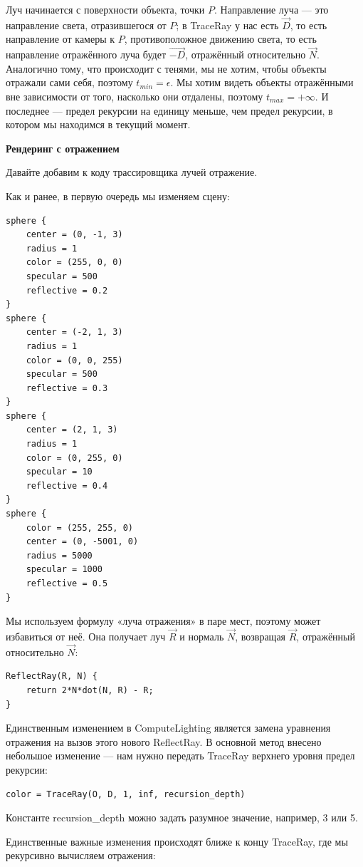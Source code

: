 Луч начинается с поверхности объекта, точки $P$. Направление луча — это направление света, отразившегося от $P$; в TraceRay у нас есть $\vec{D}$, то есть направление от камеры к $P$, противоположное движению света, то есть направление отражённого луча будет $\vec{-D}$, отражённый относительно $\vec{N}$. Аналогично тому, что происходит с тенями, мы не хотим, чтобы объекты отражали сами себя, поэтому $t_{min} = \epsilon$. Мы хотим видеть объекты отражёнными вне зависимости от того, насколько они отдалены, поэтому $t_{max} = +\infty$. И последнее — предел рекурсии на единицу меньше, чем предел рекурсии, в котором мы находимся в текущий момент.

\textbf{Рендеринг с отражением}

Давайте добавим к коду трассировщика лучей отражение.

Как и ранее, в первую очередь мы изменяем сцену:
\begin{lstlisting}
sphere {
    center = (0, -1, 3)
    radius = 1
    color = (255, 0, 0) 
    specular = 500  
    reflective = 0.2  
}
sphere {
    center = (-2, 1, 3)
    radius = 1
    color = (0, 0, 255) 
    specular = 500  
    reflective = 0.3  
}
sphere {
    center = (2, 1, 3)
    radius = 1
    color = (0, 255, 0)  
    specular = 10  
    reflective = 0.4  
}
sphere {
    color = (255, 255, 0)  
    center = (0, -5001, 0)
    radius = 5000
    specular = 1000  
    reflective = 0.5  
}
\end{lstlisting}

Мы используем формулу «луча отражения» в паре мест, поэтому может избавиться от неё. Она получает луч $\vec{R}$ и нормаль $\vec{N}$, возвращая $\vec{R}$, отражённый относительно $\vec{N}$:

\begin{lstlisting}
ReflectRay(R, N) {
    return 2*N*dot(N, R) - R;
}
\end{lstlisting}

Единственным изменением в ComputeLighting является замена уравнения отражения на вызов этого нового ReflectRay.
В основной метод внесено небольшое изменение — нам нужно передать TraceRay верхнего уровня предел рекурсии:

\begin{lstlisting}
color = TraceRay(O, D, 1, inf, recursion_depth)
\end{lstlisting}

Константе recursion\_depth можно задать разумное значение, например, 3 или 5.

Единственные важные изменения происходят ближе к концу TraceRay, где мы рекурсивно вычисляем отражения:

